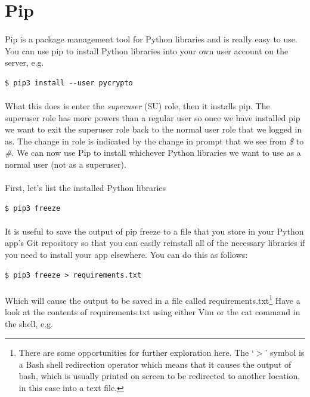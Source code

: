 \documentclass[12pt, a4paper, oneside]{book}
\begin{document}
{\section{Pip}
\label{pip}
\paragraph{} Pip is a package management tool for Python libraries and is really easy to use. You can use pip to install Python libraries into your own user account on the server, e.g.
\begin{lstlisting}[style=DOS]
    $ pip3 install --user pycrypto
\end{lstlisting}

\paragraph{} What this does is enter the \emph{superuser} (SU) role, then it installs pip. The superuser role has more powers than a regular user so once we have installed pip we want to exit the superuser role back to the normal user role that we logged in as. The change in role is indicated by the change in prompt that we see from \emph{\$} to \emph{\#}. We can now use Pip to install whichever Python libraries we want to use as a normal user (not as a superuser). 

\paragraph{} First, let's list the installed Python libraries

\begin{lstlisting}[style=DOS]
    $ pip3 freeze
\end{lstlisting}

\paragraph{} It is useful to save the output of pip freeze to a file that you store in your Python app's Git repository so that you can easily reinstall all of the necessary libraries if you need to install your app elsewhere. You can do this as follows:

\begin{lstlisting}[style=DOS]
    $ pip3 freeze > requirements.txt
\end{lstlisting}

\paragraph{} Which will cause the output to be saved in a file called requirements.txt\footnote{There are some opportunities for further exploration here. The `$>$' symbol is a Bash shell redirection operator which means that it causes the output of bash, which is usually printed on screen to be redirected to another location, in this case into a text file.} Have a look at the contents of requirements.txt using either Vim or the cat command in the shell, e.g.

}
\end{document}
